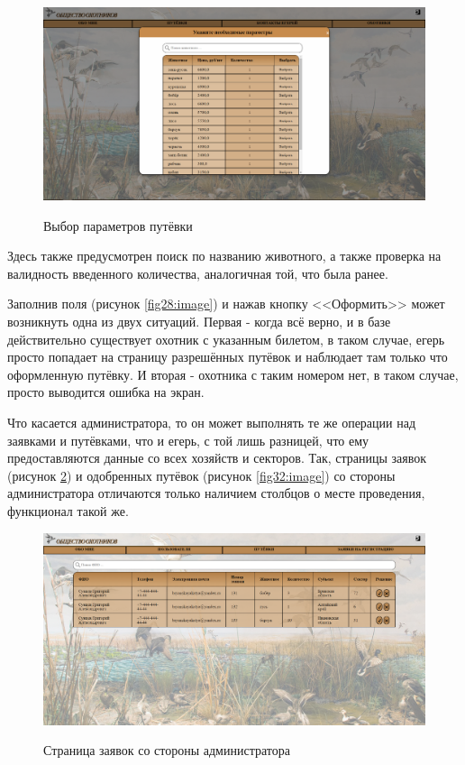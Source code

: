 	\begin{figure}[h!]
		\centering
		\begin{center}
			{\includegraphics[scale=0.34]{schemes/screens/price_list_huntsman.png}}
			\caption{Выбор параметров путёвки}
			\label{fig29:image}
		\end{center}
	\end{figure}

	Здесь также предусмотрен поиск по названию животного, а также проверка на валидность введенного количества, аналогичная той, что была ранее.
	
	Заполнив поля (рисунок \ref{fig28:image}) и нажав кнопку <<Оформить>> может возникнуть одна из двух ситуаций. Первая - когда всё верно, и в базе действительно существует охотник с указанным билетом, в таком случае, егерь просто попадает на страницу разрешённых путёвок и наблюдает там только что оформленную путёвку. И вторая - охотника с таким номером нет, в таком случае, просто выводится ошибка на экран.
	
	Что касается администратора, то он может выполнять те же операции над заявками и путёвками, что и егерь, с той лишь разницей, что ему предоставляются данные со всех хозяйств и секторов. Так, страницы заявок (рисунок \ref{fig31:image}) и одобренных путёвок (рисунок \ref{fig32:image}) со стороны администратора отличаются только наличием столбцов о месте проведения, функционал такой же.
	
	\begin{figure}[h!]
		\centering
		\begin{center}
			{\includegraphics[scale=0.34]{schemes/screens/requests_admin.png}}
			\caption{Страница заявок со стороны администратора}
			\label{fig31:image}
		\end{center}
	\end{figure}


